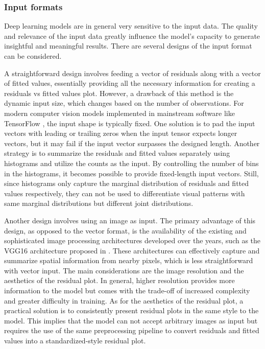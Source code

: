 \documentclass[]{interact}
\theoremstyle{plain}%
\theoremstyle{definition}
\theoremstyle{remark}
\begin{document}
\hypertarget{input-formats}{%
\subsubsection{Input formats}\label{input-formats}}

Deep learning models are in general very sensitive to the input data.
The quality and relevance of the input data greatly influence the
model's capacity to generate insightful and meaningful results. There
are several designs of the input format can be considered.

A straightforward design involves feeding a vector of residuals along
with a vector of fitted values, essentially providing all the necessary
information for creating a residuals vs fitted values plot. However, a
drawback of this method is the dynamic input size, which changes based
on the number of observations. For modern computer vision models
implemented in mainstream software like TensorFlow
\citep{abadi2016tensorflow}, the input shape is typically fixed. One
solution is to pad the input vectors with leading or trailing zeros when
the input tensor expects longer vectors, but it may fail if the input
vector surpasses the designed length. Another strategy is to summarize
the residuals and fitted values separately using histograms and utilize
the counts as the input. By controlling the number of bins in the
histograms, it becomes possible to provide fixed-length input vectors.
Still, since histograms only capture the marginal distribution of
residuals and fitted values respectively, they can not be used to
differentiate visual patterns with same marginal distributions but
different joint distributions.

Another design involves using an image as input. The primary advantage
of this design, as opposed to the vector format, is the availability of
the existing and sophisticated image processing architectures developed
over the years, such as the VGG16 architecture proposed in
\citet{simonyan2014very}. These architectures can effectively capture
and summarize spatial information from nearby pixels, which is less
straightforward with vector input. The main considerations are the image
resolution and the aesthetics of the residual plot. In general, higher
resolution provides more information to the model but comes with the
trade-off of increased complexity and greater difficulty in training. As
for the aesthetics of the residual plot, a practical solution is to
consistently present residual plots in the same style to the model. This
implies that the model can not accept arbitrary images as input but
requires the use of the same preprocessing pipeline to convert residuals
and fitted values into a standardized-style residual plot.
\end{document}

